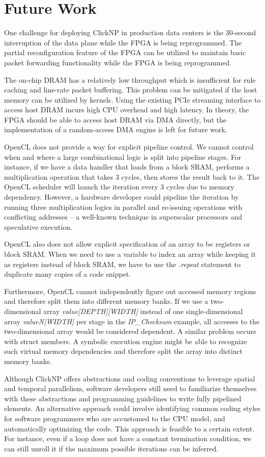 \section{Future Work}
\label{clicknp:sec:future}

One challenge for deploying ClickNP in production data centers is the 30-second interruption of the data plane while the FPGA is being reprogrammed. The partial reconfiguration \cite{bourgeault2011alteras} feature of the FPGA can be utilized to maintain basic packet forwarding functionality while the FPGA is being reprogrammed.

The on-chip DRAM has a relatively low throughput which is insufficient for rule caching and line-rate packet buffering. This problem can be mitigated if the host memory can be utilized by kernels. Using the existing PCIe streaming interface to access host DRAM incurs high CPU overhead and high latency. In theory, the FPGA should be able to access host DRAM via DMA directly, but the implementation of a random-access DMA engine is left for future work.

OpenCL does not provide a way for explicit pipeline control. We cannot control when and where a large combinational logic is split into pipeline stages. For instance, if we have a data handler that loads from a block SRAM, performs a multiplication operation that takes 3 cycles, then stores the result back to it. The OpenCL scheduler will launch the iteration every 3 cycles due to memory dependency. However, a hardware developer could pipeline the iteration by running three multiplication logics in parallel and re-issuing operations with conflicting addresses -- a well-known technique in superscalar processors and speculative execution.

OpenCL also does not allow explicit specification of an array to be registers or block SRAM. When we need to use a variable to index an array while keeping it as registers instead of block SRAM, we have to use the \textit{.repeat} statement to duplicate many copies of a code snippet.

Furthermore, OpenCL cannot independently figure out accessed memory regions and therefore split them into different memory banks. If we use a two-dimensional array \textit{value[DEPTH][WIDTH]} instead of one single-dimensional array \textit{valueN[WIDTH]} per stage in the \textit{IP\_Checksum} example, all accesses to the two-dimensional array would be considered dependent. A similar problem occurs with struct members. A symbolic execution engine might be able to recognize such virtual memory dependencies and therefore split the array into distinct memory banks.

Although ClickNP offers abstractions and coding conventions to leverage spatial and temporal parallelism, software developers still need to familiarize themselves with these abstractions and programming guidelines to write fully pipelined elements. An alternative approach could involve identifying common coding styles for software programmers who are accustomed to the CPU model, and automatically optimizing the code. This approach is feasible to a certain extent. For instance, even if a loop does not have a constant termination condition, we can still unroll it if the maximum possible iterations can be inferred.
